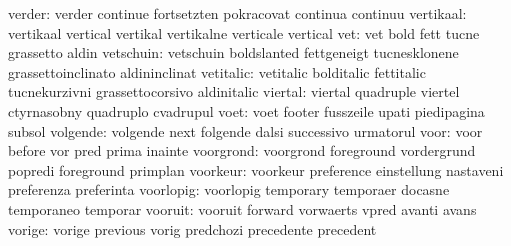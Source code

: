                    verder: verder                    continue
                           fortsetzten               pokracovat
                           continua                  continuu
                vertikaal: vertikaal                 vertical
                           vertikal                  vertikalne
                           verticale                 vertical
                      vet: vet                       bold
                           fett                      tucne
                           grassetto                 aldin
                vetschuin: vetschuin                 boldslanted
                           fettgeneigt               tucnesklonene
                           grassettoinclinato        aldininclinat
                vetitalic: vetitalic                 bolditalic
                           fettitalic                tucnekurzivni
                           grassettocorsivo          aldinitalic
                  viertal: viertal                   quadruple
                           viertel                   ctyrnasobny
                           quadruplo                 cvadrupul
                     voet: voet                      footer
                           fusszeile                 upati
                           piedipagina               subsol
                 volgende: volgende                  next
                           folgende                  dalsi
                           successivo                urmatorul
                     voor: voor                      before
                           vor                       pred
                           prima                     inainte
                voorgrond: voorgrond                 foreground
                           vordergrund               popredi
                           foreground                primplan
                 voorkeur: voorkeur                  preference
                           einstellung               nastaveni
                           preferenza                preferinta
                voorlopig: voorlopig                 temporary
                           temporaer                 docasne
                           temporaneo                temporar
                  vooruit: vooruit                   forward
                           vorwaerts                 vpred
                           avanti                    avans
                   vorige: vorige                    previous
                           vorig                     predchozi
                           precedente                precedent

